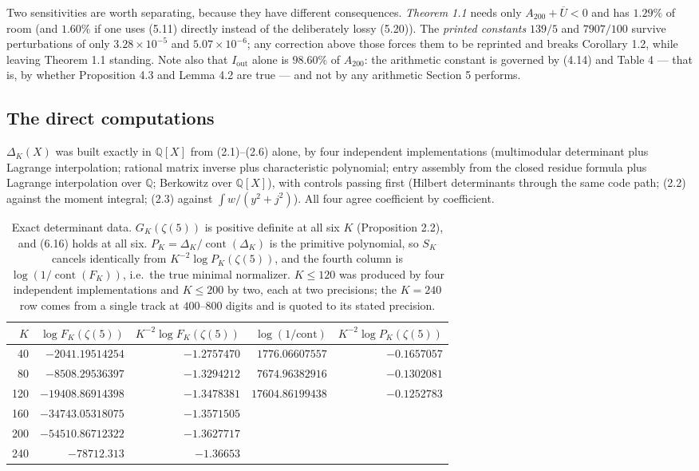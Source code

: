 \documentclass[11pt]{article}
\theoremstyle{definition}
\newcommand{\z}{\zeta(5)}
\newcommand{\Ub}{\overline{U}}
\newcommand{\Iout}{I_{\mathrm{out}}}
\begin{document}
Two sensitivities are worth separating, because they have different consequences.
\emph{Theorem 1.1} needs only $A_{200}+\Ub<0$ and has $1.29\%$ of room (and $1.60\%$ if one uses
(5.11) directly instead of the deliberately lossy (5.20)). The \emph{printed constants} $139/5$
and $7907/100$ survive perturbations of only $3.28\times10^{-5}$ and $5.07\times10^{-6}$; any
correction above those forces them to be reprinted and breaks Corollary 1.2, while leaving
Theorem 1.1 standing. Note also that $\Iout$ alone is $98.60\%$ of $A_{200}$: the arithmetic
constant is governed by (4.14) and Table 4 --- that is, by whether Proposition 4.3 and
Lemma 4.2 are true --- and not by any arithmetic Section 5 performs.

\subsection{The direct computations}

$\Delta_K(X)$ was built exactly in $\mathbb{Q}[X]$ from (2.1)--(2.6) alone, by four independent
implementations (multimodular determinant plus Lagrange interpolation; rational matrix inverse
plus characteristic polynomial; entry assembly from the closed residue formula plus Lagrange
interpolation over $\mathbb{Q}$; Berkowitz over $\mathbb{Q}[X]$), with controls passing first
(Hilbert determinants through the same code path; (2.2) against the moment integral; (2.3)
against $\int w/(y^2+j^2)$). All four agree coefficient by coefficient.

\begin{table}[htbp]
\centering
\begin{tabular}{@{}rrrrr@{}}
\toprule
$K$ & $\log F_K(\z)$ & $K^{-2}\log F_K(\z)$ & $\log(1/\mathrm{cont})$ & $K^{-2}\log P_K(\z)$ \\
\midrule
40  & $-2041.19514254$  & $-1.2757470$ & $1776.06607557$  & $-0.1657057$ \\
80  & $-8508.29536397$  & $-1.3294212$ & $7674.96382916$  & $-0.1302081$ \\
120 & $-19408.86914398$ & $-1.3478381$ & $17604.86199438$ & $-0.1252783$ \\
160 & $-34743.05318075$ & $-1.3571505$ & & \\
200 & $-54510.86712322$ & $-1.3627717$ & & \\
240 & $-78712.313$\phantom{00000} & $-1.36653$\phantom{00} & & \\
\bottomrule
\end{tabular}
\caption{Exact determinant data. $G_K(\z)$ is positive definite at all six $K$
(Proposition 2.2), and (6.16) holds at all six. $P_K=\Delta_K/\operatorname{cont}(\Delta_K)$ is
the primitive polynomial, so $S_K$ cancels identically from $K^{-2}\log P_K(\z)$, and the
fourth column is $\log(1/\operatorname{cont}(F_K))$, i.e.\ the true minimal normalizer.
$K\le120$ was produced by four independent implementations and $K\le200$ by two, each at two
precisions; the $K=240$ row comes from a single track at $400$--$800$ digits and is quoted to
its stated precision.}
\label{tab:det}
\end{table}
\end{document}
